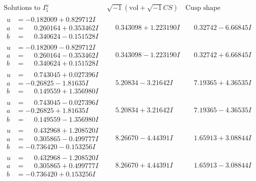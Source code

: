 \documentclass[1p]{elsarticle_modified}
\theoremstyle{definition}
\newcommand{\I}{\sqrt{-1}}
\begin{document}
$$\begin{array}{c|c|c}  
\text{Solutions to }I^u_{5}& \I (\text{vol} + \sqrt{-1}CS) & \text{Cusp shape}\\
 \hline 
\begin{aligned}
u &= -0.182009 + 0.829712 I \\
a &= \phantom{-}0.260164 + 0.353462 I \\
b &= \phantom{-}0.340624 - 0.151528 I\end{aligned}
 & \phantom{-}0.343098 + 1.223190 I & \phantom{-}0.32742 - 6.66845 I \\ \hline\begin{aligned}
u &= -0.182009 - 0.829712 I \\
a &= \phantom{-}0.260164 - 0.353462 I \\
b &= \phantom{-}0.340624 + 0.151528 I\end{aligned}
 & \phantom{-}0.343098 - 1.223190 I & \phantom{-}0.32742 + 6.66845 I \\ \hline\begin{aligned}
u &= \phantom{-}0.743045 + 0.027396 I \\
a &= -0.26825 - 1.81635 I \\
b &= \phantom{-}0.149559 + 1.356980 I\end{aligned}
 & \phantom{-}5.20834 - 3.21642 I & \phantom{-}7.19365 + 4.36535 I \\ \hline\begin{aligned}
u &= \phantom{-}0.743045 - 0.027396 I \\
a &= -0.26825 + 1.81635 I \\
b &= \phantom{-}0.149559 - 1.356980 I\end{aligned}
 & \phantom{-}5.20834 + 3.21642 I & \phantom{-}7.19365 - 4.36535 I \\ \hline\begin{aligned}
u &= \phantom{-}0.432968 + 1.208520 I \\
a &= \phantom{-}0.305865 - 0.499777 I \\
b &= -0.736420 - 0.153256 I\end{aligned}
 & \phantom{-}8.26670 - 4.44391 I & \phantom{-}1.65913 + 3.08844 I \\ \hline\begin{aligned}
u &= \phantom{-}0.432968 - 1.208520 I \\
a &= \phantom{-}0.305865 + 0.499777 I \\
b &= -0.736420 + 0.153256 I\end{aligned}
 & \phantom{-}8.26670 + 4.44391 I & \phantom{-}1.65913 - 3.08844 I \\ \hline\begin{aligned}

\end{aligned}
\end{array}$$
\end{document}
